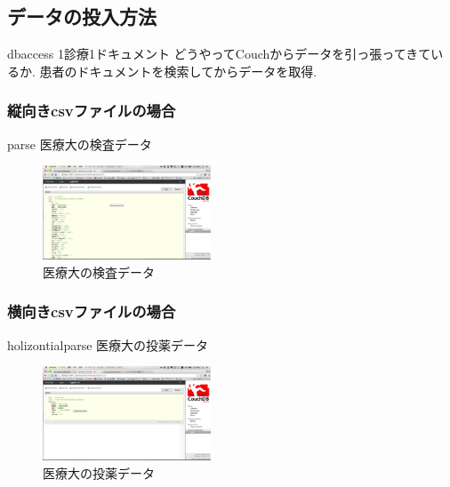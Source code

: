 

\subsection{データの投入方法}
	dbaccess
	1診療1ドキュメント
	どうやってCouchからデータを引っ張ってきているか.
	患者のドキュメントを検索してからデータを取得.
		\subsubsection{縦向きcsvファイルの場合}
			parse
			医療大の検査データ
			\\
			\begin{figure}[htbp]
					\includegraphics[width=5cm, bb=0 0 437 688]{./gazou/kensa.png}
				\caption{医療大の検査データ}
				\label{ss-mix_sampledata}
			\end{figure}

		\subsubsection{横向きcsvファイルの場合}
			holizontialparse
			医療大の投薬データ
			\\
			\begin{figure}[htbp]
					\includegraphics[width=5cm, bb=0 0 437 688]{./gazou/touyaku.png}
				\caption{医療大の投薬データ}
				\label{ss-mix_sampledata}
			\end{figure}

